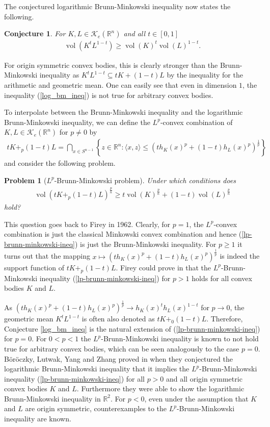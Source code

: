 \documentclass[12pt,twoside]{amsart}
\numberwithin{satz}{section}
\newtheorem{conjecture}[satz]{Conjecture}
\newtheorem{problem}[satz]{Problem}
\theoremstyle{definition}
\numberwithin{equation}{section}
\newcommand\R{\mathbb{R}}
\newcommand\vol{\operatorname{vol}}
\newcommand\Kc{\mathcal{K}}
\begin{document}
	The conjectured logarithmic Brunn-Minkowski inequality now states the following. 
	\begin{conjecture}\label{log_bm}
		For $K,L\in\Kc_e(\R^n)$ and all $t\in[0,1]$
		\begin{align}\label{log_bm_ineq}
			\vol(K^tL^{1-t})\geq \vol(K)^t\vol(L)^{1-t}.
		\end{align}
	\end{conjecture}
	For origin symmetric convex bodies, this is clearly stronger than the Brunn-Minkowski inequality as $K^tL^{1-t}\subseteq tK+(1-t)L$ by the inequality for the arithmetic and geometric mean. One can easily see that even in dimension $1$, the inequality (\ref{log_bm_ineq}) is not true for arbitrary convex bodies.
	
	To interpolate between the Brunn-Minkowski inequality and the logarithmic Brunn-Minkowski inequality, we can define the $L^p$-convex combination of $K,L\in\Kc_e(\R^n)$ for $p\neq0$ by
	\begin{align*}
		tK+_p(1-t)L = \bigcap_{x\in S^{n-1}}\left\{z\in\R^n:\langle x,z\rangle\leq \left(th_K(x)^p+(1-t)h_L(x)^p\right)^{\frac{1}{p}} \right\}
	\end{align*}
	and consider the following problem.
	\begin{problem}[$L^p$-Brunn-Minkowski problem]
		Under which conditions does
		\begin{align}\label{lp-brunn-minkowski-ineq}
			\vol(tK+_p(1-t)L)^{\frac{p}{n}}\geq t\vol(K)^{\frac{p}{n}}+(1-t)\vol(L)^{\frac{p}{n}}
		\end{align}
		hold?
	\end{problem}
	This question goes back to Firey \cite{firey} in 1962. Clearly, for $p=1$, the $L^p$-convex combination is just the classical Minkowski convex combination and hence (\ref{lp-brunn-minkowski-ineq}) is just the Brunn-Minkowski inequality. For $p\geq 1$ it turns out that the mapping $x\mapsto\left(th_K(x)^p+(1-t)h_L(x)^p\right)^{\frac{1}{p}}$ is indeed the support function of $tK+_p(1-t)L$. Firey could prove in \cite{firey} that the $L^p$-Brunn-Minkowski inequality (\ref{lp-brunn-minkowski-ineq}) for $p>1$ holds for all convex bodies $K$ and $L$.
	
	As $\left(th_K(x)^p+(1-t)h_L(x)^p\right)^{\frac{1}{p}}\to h_K(x)^th_L(x)^{1-t}$ for $p\to 0$, the geometric mean $K^tL^{1-t}$ is often also denoted as $tK+_0(1-t)L$. Therefore, Conjecture \ref{log_bm_ineq} is the natural extension of (\ref{lp-brunn-minkowski-ineq}) for $p=0$. For $0<p<1$ the $L^p$-Brunn-Minkowski inequality is known to not hold true for arbitrary convex bodies, which can be seen analogously to the case $p=0$. Böröczky, Lutwak, Yang and Zhang proved in \cite{boeroeczkylutwagyangzhang} when they conjectured the logarithmic Brunn-Minkowski inequality that it implies the $L^p$-Brunn-Minkowski inequality (\ref{lp-brunn-minkowski-ineq}) for all $p>0$ and all origin symmetric convex bodies $K$ and $L$. Furthermore they were able to show the logarithmic Brunn-Minkowski inequality in $\R^2$. For $p<0$, even under the assumption that $K$ and $L$ are origin symmetric, counterexamples to the $L^p$-Brunn-Minkowski inequality are known.
	
\end{document}
